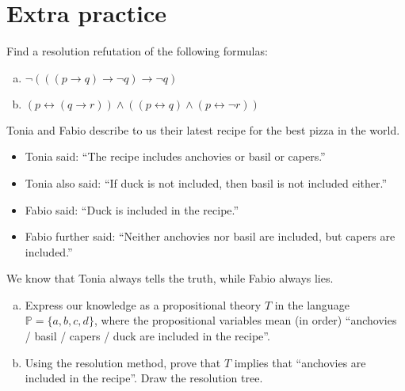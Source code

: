         
\section*{Extra practice}
        

\begin{problem}
    
    Find a resolution refutation of the following formulas:
    \begin{enumerate}[(a)]
        \item $\neg(((p\to q)\to \neg q)\to \neg q)$
        \item $(p\leftrightarrow (q\to r))\wedge((p\leftrightarrow q)\wedge(p\leftrightarrow \neg r))$        
    \end{enumerate}
\end{problem}


\begin{problem}

    Tonia and Fabio describe to us their latest recipe for the best pizza in the world.
    \begin{itemize}
        \item Tonia said: ``The recipe includes anchovies or basil or capers.''
        \item Tonia also said: ``If duck is not included, then basil is not included either.''
        \item Fabio said: ``Duck is included in the recipe.'' 
        \item Fabio further said: ``Neither anchovies nor basil are included, but capers are included.''
    \end{itemize}
    We know that Tonia always tells the truth, while Fabio always lies.

    \begin{enumerate}[(a)]
        \item Express our knowledge as a propositional theory $T$ in the language $\mathbb P=\{a,b,c,d\}$, where the propositional variables mean (in order) ``anchovies / basil / capers / duck are included in the recipe''.
        \item Using the resolution method, prove that $T$ implies that ``anchovies are included in the recipe''. Draw the resolution tree.
    \end{enumerate}

\end{problem}



